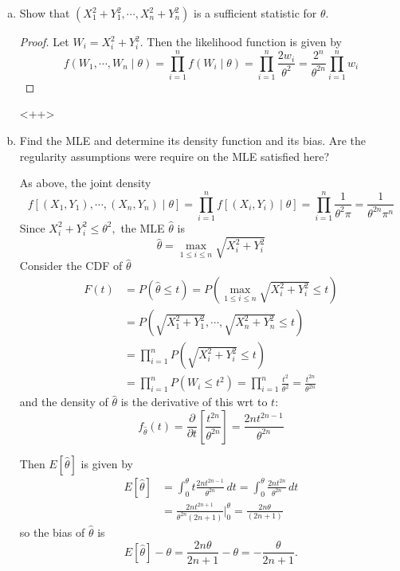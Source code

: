 \documentclass{article}
\begin{document}
\begin{enumerate}
\begin{enumerate}[(a)]
\begin{proof}
				\end{proof}

			\item Show that $(X_1^2+Y_1^2, \cdots, X_n^2+Y_n^2)$ is a sufficient statistic for $\theta.$
				\begin{proof}
					Let $W_i=X_i^2+Y_i^2.$ Then the likelihood function is given by \[f(W_1, \cdots, W_n\mid \theta) = \prod_{i=1}^{n}f(W_i\mid\theta)=\prod_{i=1}^{n}\frac{2w_i}{\theta^2} = \frac{2^n}{\theta^{2n}}\prod_{i=1}^{n}w_i\]
				\end{proof}<++>

			\item Find the MLE and determine its density function and its bias. Are the regularity assumptions were require on the MLE satisfied here?
				\begin{soln}
					As above, the joint density \[f\left[ (X_1, Y_1), \cdots, (X_n, Y_n)\mid \theta \right] = \prod_{i=1}^{n}f\left[ (X_i, Y_i)\mid \theta \right]=\prod_{i=1}^{n}\frac{1}{\theta^2\pi} = \frac{1}{\theta^{2n}\pi^{n}}\] Since $X_i^2+Y_i^2\le \theta^2,$ the MLE $\hat{\theta}$ is \[\hat{\theta}=\max_{1\le i\le n} \sqrt{X_i^2+Y_i^2}\] Consider the CDF of $\hat{\theta}$ 
					\begin{align*}
						F(t)&=P(\hat{\theta}\le t) = P\left( \max_{1\le i\le n} \sqrt{X_i^2+Y_i^2} \le t\right) \\
						&= P\left( \sqrt{X_1^2+Y_1^2},\cdots, \displaystyle \sqrt{X_n^2+Y_n^2}\le t \right) \\
						&= \prod_{i=1}^{n}P\left(\sqrt{X_i^2+Y_i^2}\le t\right) \\
						&= \prod_{i=1}^{n} P(W_i\le t^2) = \prod_{i=1}^{n} \frac{t^2}{\theta^2} = \frac{t^{2n}}{\theta^{2n}} 
					\end{align*} and the density of $\hat{\theta}$ is the derivative of this wrt to $t:$
					\[f_{\hat{\theta}}(t) = \frac{\partial}{\partial t}\left[ \frac{t^{2n}}{\theta^{2n}} \right]=\frac{2n t^{2n-1}}{\theta^{2n}}\] 

					Then $E[\hat{\theta}]$ is given by
					\begin{align*}
						E[ \hat{\theta}] &= \int_0^\theta t\frac{2nt^{2n-1}}{\theta^{2n}}\, dt = \int_0^\theta \frac{2nt^{2n}}{\theta^{2n}}\, dt \\
						&= \frac{2nt^{2n+1}}{\theta^{2n}(2n+1)}\bigg\vert_0^\theta =\frac{2n\theta}{(2n+1)} 
					\end{align*} so the bias of $\hat{\theta}$ is \[E[\hat{\theta}]-\theta=\frac{2n\theta}{2n+1}-\theta = -\frac{\theta}{2n+1}.\]


\end{soln}
\end{enumerate}
\end{enumerate}
\end{document}
